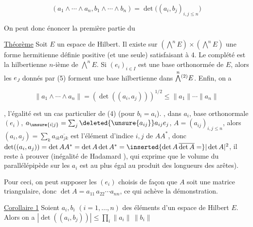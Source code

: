 \[
\boxed{(a_1\wedge\cdots\wedge a_n,b_1\wedge\cdots\wedge b_n)=\det\big((a_i,b_j)_{i,j\leq n}\big)} \tag*{(4)}
\]


On peut donc énoncer la première partie du

 \uline{Théorème} Soit  $E$ un espace de Hilbert. Il existe sur
$(\overset{n}{\bigwedge}E)\times(\overset{n}{\bigwedge}E)$ une forme hermitienne définie positive (et une seule)
satisfaisant à 4. Le complété est la   hilbertienne
$n$-ième de $\overset{n}{\bigwedge}E$.  Si $(e_i)_{i\in I}$ est une base  orthonormée
de $E$, alors les $e_J$ donnés par (5) forment une base
 hilbertienne
 dans $\overset{n}{\bigwedge}\vphantom{\bigwedge}^{(2)}E$. Enfin, on a

\[
\boxed{\|a_1\wedge\cdots\wedge a_n\|=(\det((a_i,a_j)))^{1/2}\leq\|a_1\|\cdots\|a_n\|} \tag*{(5)}
\]

, l'égalité  est un cas particulier de (4) (pour $b_i=a_i$).
, dans   $a_i$, 
base orthonormale $(e_i)$, 
  $a_{\unsure{i|j}}=\sum_j\deleted{\unsure{a_{ij}}}a_{ij}e_j$,
 $A=(a_{ij})_{i,j\leq n}$, alors $(a_i,a_j)=\sum_k a_{ik}\overline{a_{jk}}$
est l'élément d'indice $i,j$ de  $AA^*$, donc
$\det((a_i,a_j))=\det AA^*=\det A\det A^*=\inserted{\det A\,\overline{\det A}=}|\det A|^2$,  il
reste à prouver  (inégalité
de Hadamard \unsure{!}), qui exprime que le volume du
parallélépipède  sur les $a_i$ est au plus
égal au produit des longueurs des arêtes).


Pour ceci, on peut supposer les $(e_i)$ choisis de façon
que $A$ soit une matrice triangulaire, donc
$\det A=a_{11}\,a_{22}\cdots a_{nn}$, ce qui achève la démonstration.

\uline{Corollaire 1} Soient $a_i,b_i$ $(i=1,\ldots,n)$ des éléments d'un espace
de Hilbert $E$. Alors on a $|\det((a_i,b_j))|\leq\prod_i\|a_i\|\,\|b_i\|$

